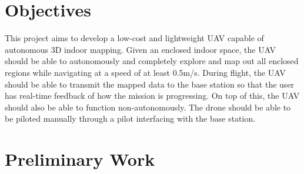 \documentclass[english]{upeeei}
\begin{document}
\chapter{Objectives}
This project aims to develop a low-cost and lightweight UAV capable of autonomous 3D indoor mapping. Given an enclosed
indoor space, the UAV should be able to autonomously and completely explore and map out all enclosed regions while navigating at
a speed of at least 0.5m/s. 
During flight, the UAV should be able to transmit the mapped data to the base station so that the user has real-time feedback of
how the mission is progressing. On top of this, the UAV should also be able to function non-autonomously. The drone should be
able to be piloted manually through a pilot interfacing with the base station. 
\chapter{Preliminary Work}
\end{document}
